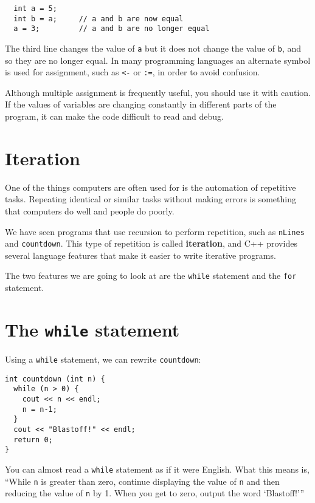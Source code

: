 \begin{lstlisting}
  int a = 5;
  int b = a;     // a and b are now equal
  a = 3;         // a and b are no longer equal
\end{lstlisting}
%
The third line changes the value of {\tt a} but it does not
change the value of {\tt b}, and so they are no longer equal.
In many programming languages an alternate symbol is used
for assignment, such as {\tt <-} or {\tt :=}, in order to
avoid confusion.

Although multiple assignment is frequently useful, you should
use it with caution.  If the values of variables are changing
constantly in different parts of the program, it can make
the code difficult to read and debug.

\section{Iteration}

One of the things computers are often used for is the automation
of repetitive tasks.  Repeating identical or similar tasks without
making errors is something that computers do well and people do
poorly.

We have seen programs that use recursion to perform
repetition, such as {\tt nLines} and {\tt countdown}.  This
type of repetition is called {\bf iteration}, and C++ provides
several language features that make it easier to write iterative
programs.

The two features we are going to look at are the {\tt while}
statement and the {\tt for} statement.

\section{The {\tt while} statement}

Using a {\tt while} statement, we can rewrite {\tt countdown}:

\begin{lstlisting}
int countdown (int n) {
  while (n > 0) {
    cout << n << endl;
    n = n-1;
  }
  cout << "Blastoff!" << endl;
  return 0;
}
\end{lstlisting}
%
You can almost read a {\tt while} statement as if it were
English.  What this means is, ``While {\tt n} is greater than
zero, continue displaying the value of {\tt n} and then reducing
the value of {\tt n} by 1.  When you get to zero, output the
word `Blastoff!'''

